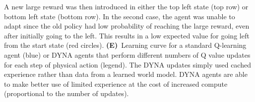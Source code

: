 \begin{figure*}[!t]
{        A new large reward was then introduced in either the top left state (top row) or bottom left state (bottom row).
        In the second case, the agent was unable to adapt since the old policy had low probability of reaching the large reward, even after initially going to the left.
        This results in a low expected value for going left from the start state (red circles).
        {\bfseries (E)}~Learning curve for a standard Q-learning agent (blue) or DYNA agents that perform different numbers of Q value updates for each step of physical action (legend).
        The DYNA updates simply used cached experience rather than data from a learned world model.
        DYNA agents are able to make better use of limited experience at the cost of increased compute (proportional to the number of updates).
        }
    \vspace*{-1.0em}
\end{figure*}

